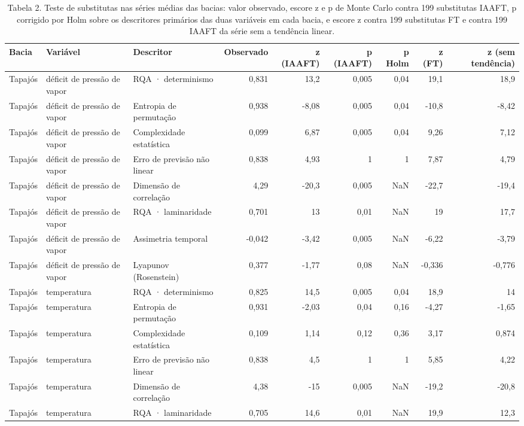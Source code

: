 \begin{table}
\caption{Tabela 2. Teste de substitutas nas séries médias das bacias: valor observado, escore z e p de Monte Carlo contra 199 substitutas IAAFT, p corrigido por Holm sobre os descritores primários das duas variáveis em cada bacia, e escore z contra 199 substitutas FT e contra 199 IAAFT da série sem a tendência linear.}
\label{tab:06_surrogates::resultado_bacias}
\begin{tabular}{lllrrrrrr}
\toprule
Bacia & Variável & Descritor & Observado & z (IAAFT) & p (IAAFT) & p Holm & z (FT) & z (sem tendência) \\
\midrule
Tapajós & déficit de pressão de vapor & RQA · determinismo & 0,831 & 13,2 & 0,005 & 0,04 & 19,1 & 18,9 \\
Tapajós & déficit de pressão de vapor & Entropia de permutação & 0,938 & -8,08 & 0,005 & 0,04 & -10,8 & -8,42 \\
Tapajós & déficit de pressão de vapor & Complexidade estatística & 0,099 & 6,87 & 0,005 & 0,04 & 9,26 & 7,12 \\
Tapajós & déficit de pressão de vapor & Erro de previsão não linear & 0,838 & 4,93 & 1 & 1 & 7,87 & 4,79 \\
Tapajós & déficit de pressão de vapor & Dimensão de correlação & 4,29 & -20,3 & 0,005 & NaN & -22,7 & -19,4 \\
Tapajós & déficit de pressão de vapor & RQA · laminaridade & 0,701 & 13 & 0,01 & NaN & 19 & 17,7 \\
Tapajós & déficit de pressão de vapor & Assimetria temporal & -0,042 & -3,42 & 0,005 & NaN & -6,22 & -3,79 \\
Tapajós & déficit de pressão de vapor & Lyapunov (Rosenstein) & 0,377 & -1,77 & 0,08 & NaN & -0,336 & -0,776 \\
Tapajós & temperatura & RQA · determinismo & 0,825 & 14,5 & 0,005 & 0,04 & 18,9 & 14 \\
Tapajós & temperatura & Entropia de permutação & 0,931 & -2,03 & 0,04 & 0,16 & -4,27 & -1,65 \\
Tapajós & temperatura & Complexidade estatística & 0,109 & 1,14 & 0,12 & 0,36 & 3,17 & 0,874 \\
Tapajós & temperatura & Erro de previsão não linear & 0,838 & 4,5 & 1 & 1 & 5,85 & 4,22 \\
Tapajós & temperatura & Dimensão de correlação & 4,38 & -15 & 0,005 & NaN & -19,2 & -20,8 \\
Tapajós & temperatura & RQA · laminaridade & 0,705 & 14,6 & 0,01 & NaN & 19,9 & 12,3 \\

\end{tabular}
\end{table}

